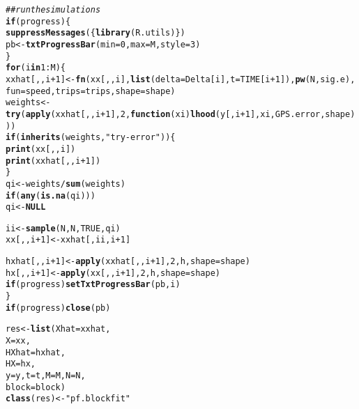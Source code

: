 \documentclass[11pt]{article}\usepackage[]{graphicx}\usepackage[]{color}
\makeatletter
\newcommand{\hlnum}[1]{\textcolor[rgb]{0.686,0.059,0.569}{#1}}%
\newcommand{\hlstr}[1]{\textcolor[rgb]{0.192,0.494,0.8}{#1}}%
\newcommand{\hlcom}[1]{\textcolor[rgb]{0.678,0.584,0.686}{\textit{#1}}}%
\newcommand{\hlopt}[1]{\textcolor[rgb]{0,0,0}{#1}}%
\newcommand{\hlstd}[1]{\textcolor[rgb]{0.345,0.345,0.345}{#1}}%
\newcommand{\hlkwa}[1]{\textcolor[rgb]{0.161,0.373,0.58}{\textbf{#1}}}%
\newcommand{\hlkwb}[1]{\textcolor[rgb]{0.69,0.353,0.396}{#1}}%
\newcommand{\hlkwc}[1]{\textcolor[rgb]{0.333,0.667,0.333}{#1}}%
\newcommand{\hlkwd}[1]{\textcolor[rgb]{0.737,0.353,0.396}{\textbf{#1}}}%
\newenvironment{kframe}{%
 \def\at@end@of@kframe{}%
 \ifinner\ifhmode%
  \def\at@end@of@kframe{\end{minipage}}%
  \begin{minipage}{\columnwidth}%
 \fi\fi%
 \def\FrameCommand##1{\hskip\@totalleftmargin \hskip-\fboxsep
 \colorbox{shadecolor}{##1}\hskip-\fboxsep
     \hskip-\linewidth \hskip-\@totalleftmargin \hskip\columnwidth}%
 \MakeFramed {\advance\hsize-\width
   \@totalleftmargin\z@ \linewidth\hsize
   \@setminipage}}%
 {\par\unskip\endMakeFramed%
 \at@end@of@kframe}
\newenvironment{knitrout}{}{} %
\makeatother
\begin{document}
\begin{knitrout}
\begin{kframe}
\begin{alltt}
    \hlcom{## run the simulations}
    \hlkwa{if} \hlstd{(progress) \{}
        \hlkwd{suppressMessages}\hlstd{(\{}\hlkwd{library}\hlstd{(R.utils)\})}
        \hlstd{pb} \hlkwb{<-} \hlkwd{txtProgressBar}\hlstd{(}\hlkwc{min} \hlstd{=} \hlnum{0}\hlstd{,} \hlkwc{max} \hlstd{= M,} \hlkwc{style} \hlstd{=} \hlnum{3}\hlstd{)}
    \hlstd{\}}
    \hlkwa{for} \hlstd{(i} \hlkwa{in} \hlnum{1}\hlopt{:}\hlstd{M) \{}
        \hlstd{xxhat[,,i}\hlopt{+}\hlnum{1}\hlstd{]} \hlkwb{<-} \hlkwd{fn}\hlstd{(xx[,,i],} \hlkwd{list}\hlstd{(}\hlkwc{delta}\hlstd{=Delta[i],} \hlkwc{t}\hlstd{=TIME[i}\hlopt{+}\hlnum{1}\hlstd{]),} \hlkwd{pw}\hlstd{(N, sig.e),}
                           \hlkwc{fun} \hlstd{= speed,} \hlkwc{trips} \hlstd{= trips,} \hlkwc{shape} \hlstd{= shape)}
        \hlstd{weights} \hlkwb{<-} \hlkwd{try}\hlstd{(}\hlkwd{apply}\hlstd{(xxhat[,,i}\hlopt{+}\hlnum{1}\hlstd{],} \hlnum{2}\hlstd{,} \hlkwa{function}\hlstd{(}\hlkwc{xi}\hlstd{)} \hlkwd{lhood}\hlstd{(y[,i}\hlopt{+}\hlnum{1}\hlstd{], xi, GPS.error, shape)))}
        \hlkwa{if} \hlstd{(}\hlkwd{inherits}\hlstd{(weights,} \hlstr{"try-error"}\hlstd{)) \{}
            \hlkwd{print}\hlstd{(xx[,,i])}
            \hlkwd{print}\hlstd{(xxhat[,,i}\hlopt{+}\hlnum{1}\hlstd{])}
        \hlstd{\}}
        \hlstd{qi} \hlkwb{<-} \hlstd{weights} \hlopt{/} \hlkwd{sum}\hlstd{(weights)}
        \hlkwa{if} \hlstd{(}\hlkwd{any}\hlstd{(}\hlkwd{is.na}\hlstd{(qi)))}
            \hlstd{qi} \hlkwb{<-} \hlkwa{NULL}

        \hlstd{ii} \hlkwb{<-} \hlkwd{sample}\hlstd{(N, N,} \hlnum{TRUE}\hlstd{, qi)}
        \hlstd{xx[,,i}\hlopt{+}\hlnum{1}\hlstd{]} \hlkwb{<-} \hlstd{xxhat[,ii,i}\hlopt{+}\hlnum{1}\hlstd{]}

        \hlstd{hxhat[,,i}\hlopt{+}\hlnum{1}\hlstd{]} \hlkwb{<-} \hlkwd{apply}\hlstd{(xxhat[,,i}\hlopt{+}\hlnum{1}\hlstd{],} \hlnum{2}\hlstd{, h,} \hlkwc{shape} \hlstd{= shape)}
        \hlstd{hx[,,i}\hlopt{+}\hlnum{1}\hlstd{]} \hlkwb{<-} \hlkwd{apply}\hlstd{(xx[,,i}\hlopt{+}\hlnum{1}\hlstd{],} \hlnum{2}\hlstd{, h,} \hlkwc{shape} \hlstd{= shape)}
        \hlkwa{if} \hlstd{(progress)} \hlkwd{setTxtProgressBar}\hlstd{(pb, i)}
    \hlstd{\}}
    \hlkwa{if} \hlstd{(progress)} \hlkwd{close}\hlstd{(pb)}

    \hlstd{res} \hlkwb{<-} \hlkwd{list}\hlstd{(}\hlkwc{Xhat} \hlstd{= xxhat,}
                \hlkwc{X} \hlstd{= xx,}
                \hlkwc{HXhat} \hlstd{= hxhat,}
                \hlkwc{HX} \hlstd{= hx,}
                \hlkwc{y} \hlstd{= y,} \hlkwc{t} \hlstd{= t,} \hlkwc{M} \hlstd{= M,} \hlkwc{N} \hlstd{= N,}
                \hlkwc{block} \hlstd{= block)}
    \hlkwd{class}\hlstd{(res)} \hlkwb{<-} \hlstr{"pf.blockfit"}


\end{alltt}
\end{kframe}
\end{knitrout}
\end{document}
